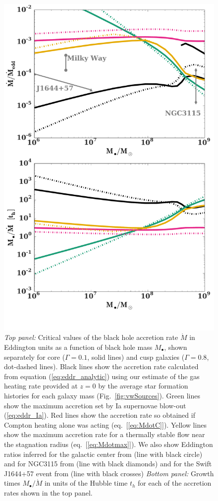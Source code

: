 \documentclass[usenatbib,fleqn]{mn2e}
\newcommand{\Mdot}{\dot{M}}
\newcommand{\Mbh}[1][]{M_{\bullet#1}}
\renewcommand{\th}{t_h}
\begin{document}
\begin{figure}
\includegraphics[width=\columnwidth]{mdot_sfr.pdf}
\caption{\label{fig:bh_growth} {\it Top panel:} Critical values of the
  black hole accretion rate $\dot{M}$ in Eddington units as a function
  of black hole mass $M_{\bullet}$, shown separately for core
  ($\Gamma=0.1$, solid lines) and cusp galaxies ($\Gamma=0.8$,
  dot-dashed lines).  Black lines show the accretion rate calculated
  from equation (\ref{eq:eddr_analytic}) using our estimate of the gas
  heating rate provided at $z = 0$ by the average star formation
  histories for each galaxy mass (Fig.~\ref{fig:vwSources}).  Green
  lines show the maximum accretion set by Ia supernovae blow-out
  (\ref{eq:eddr_Ia}).  Red lines show the accretion rate so obtained
  if Compton heating alone was acting (eq.~[\ref{eq:MdotC}]).  Yellow
  lines show the maximum accretion rate for a thermally stable flow
  near the stagnation radius (eq.~[\ref{eq:Mdotmax}]).  We also show
  Eddington ratios inferred for the galactic center from
  \citet{Quataert:2004a} (line with black circle) and for NGC3115 from
  \citet{ShcherbakovWong+:2014a} (line with black diamonds) and for
  the Swift J1644+57 event from \citet{BergerZauderer+:2012a} (line
  with black crosses) {\it Bottom panel:} Growth times $\Mbh/\Mdot$
  in units of the Hubble time $\th$ for each of the accretion rates
  shown in the top panel.}
\end{figure}
\end{document}
